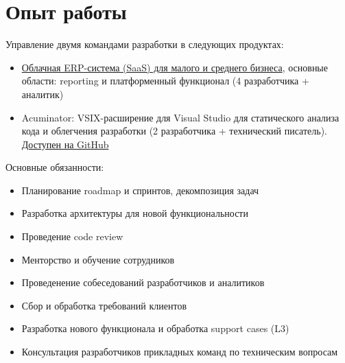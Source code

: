\section{Опыт работы}
{Управление двумя командами разработки в следующих продуктах:
\begin{itemize}[label=\textbullet]
  \item \href{https://www.acumatica.com/}{Облачная ERP-система (SaaS) для малого и среднего бизнеса}, основные области: reporting и платформенный функционал (4 разработчика + аналитик)
  \item Acuminator: VSIX-расширение для Visual Studio для статического анализа кода и облегчения разработки (2 разработчика + технический писатель). \href{https://github.com/Acumatica/Acuminator}{Доступен на GitHub \faGithub}
\end{itemize}
Основные обязанности:
\begin{itemize}[label=\textbullet]
  \item Планирование roadmap и спринтов, декомпозиция задач
  \item Разработка архитектуры для новой функциональности
  \item Проведение code review
  \item Менторство и обучение сотрудников
  \item Проведенение собеседований разработчиков и аналитиков
  \item Сбор и обработка требований клиентов
  \item Разработка нового функционала и обработка support cases (L3)
  \item Консультация разработчиков прикладных команд по техническим вопросам
\end{itemize}}
